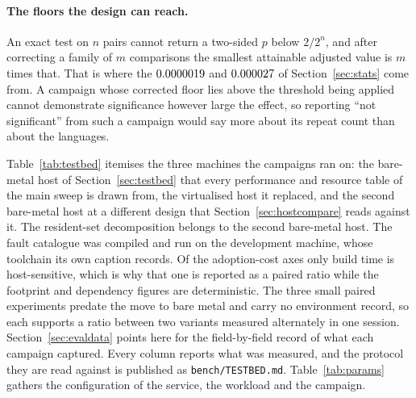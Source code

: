 \documentclass[english,oneside,a4paper,censored,csm,software-track-2020]{HYthesisML}
\begin{document}
\begin{appendices}
\paragraph{The floors the design can reach.}
An exact test on $n$ pairs cannot return a two-sided $p$ below $2/2^{n}$, and after correcting a
family of $m$ comparisons the smallest attainable adjusted value is $m$ times that. That is where
the $0.0000019$ and $0.000027$ of Section~\ref{sec:stats} come from. A campaign whose
corrected floor lies above the threshold being applied cannot demonstrate significance however
large the effect, so reporting ``not significant'' from such a campaign would say more about its
repeat count than about the languages.

Table~\ref{tab:testbed} itemises the three machines the campaigns ran on: the bare-metal host of
Section~\ref{sec:testbed} that every performance and resource table of the main sweep is drawn from,
the virtualised host it replaced, and the second bare-metal host at a different design that
Section~\ref{sec:hostcompare} reads against it. The resident-set decomposition belongs to the
second bare-metal host. The fault catalogue was compiled and run on the development machine,
whose toolchain its own caption records. Of the adoption-cost axes only build time is
host-sensitive, which is why that one is reported as a paired ratio while the footprint and
dependency figures are deterministic. The three small paired experiments predate the move to
bare metal and carry no environment record, so each supports a ratio between two variants measured
alternately in one session. Section~\ref{sec:evaldata} points here for the field-by-field
record of what each campaign captured. Every column reports what was measured, and the protocol
they are read against is published as \texttt{bench/TESTBED.md}. Table~\ref{tab:params} gathers
the configuration of the service, the workload and the campaign.


\end{appendices}
\end{document}
